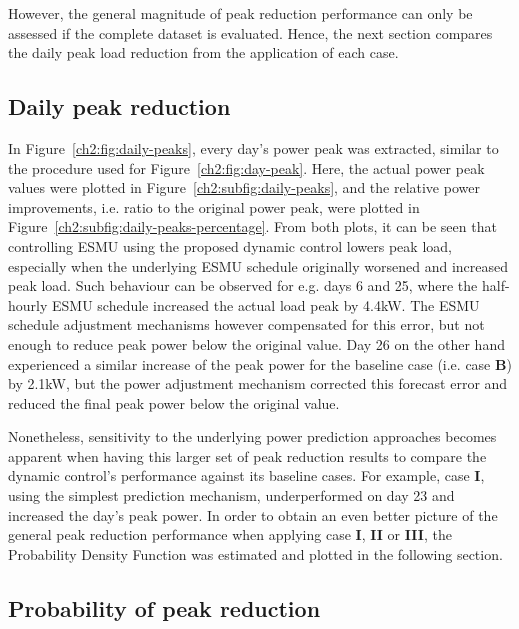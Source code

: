 

However, the general magnitude of peak reduction performance can only be assessed if the complete dataset is evaluated.
Hence, the next section compares the daily peak load reduction from the application of each case.

\subsection{Daily peak reduction}



In Figure~\ref{ch2:fig:daily-peaks}, every day's power peak was extracted, similar to the procedure used for Figure~\ref{ch2:fig:day-peak}.
Here, the actual power peak values were plotted in Figure~\ref{ch2:subfig:daily-peaks}, and the relative power improvements, i.e. ratio to the original power peak, were plotted in Figure~\ref{ch2:subfig:daily-peaks-percentage}.
From both plots, it can be seen that controlling ESMU using the proposed dynamic control lowers peak load, especially when the underlying ESMU schedule originally worsened and increased peak load.
Such behaviour can be observed for e.g. days 6 and 25, where the half-hourly ESMU schedule increased the actual load peak by 4.4kW.
The ESMU schedule adjustment mechanisms however compensated for this error, but not enough to reduce peak power below the original value.
Day 26 on the other hand experienced a similar increase of the peak power for the baseline case (i.e. case \textbf{B}) by 2.1kW, but the power adjustment mechanism corrected this forecast error and reduced the final peak power below the original value.

Nonetheless, sensitivity to the underlying power prediction approaches becomes apparent when having this larger set of peak reduction results to compare the dynamic control's performance against its baseline cases.
For example, case \textbf{I}, using the simplest prediction mechanism, underperformed on day 23 and increased the day's peak power.
In order to obtain an even better picture of the general peak reduction performance when applying case \textbf{I}, \textbf{II} or \textbf{III}, the Probability Density Function was estimated and plotted in the following section.

\subsection{Probability of peak reduction}
\label{ch2:subsec:probability-of-peak-reduction}

